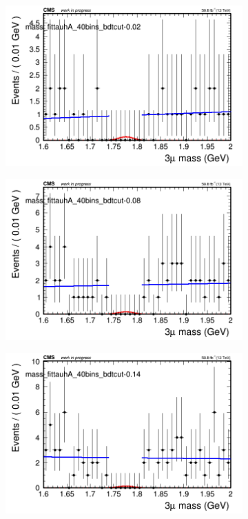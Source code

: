 \begin{figure}[H]
    \centering
    \begin{subfigure}{0.2\textwidth}
        \includegraphics[width=\textwidth]{power_law/plots/tauhA/massfit_tauhA_40bins_bdtcut-0.02.png}
        \caption{}
    \end{subfigure}
    \begin{subfigure}{0.2\textwidth}
        \includegraphics[width=\textwidth]{power_law/plots/tauhA/massfit_tauhA_40bins_bdtcut-0.08.png}
        \caption{}
    \end{subfigure}
    \begin{subfigure}{0.2\textwidth}
        \includegraphics[width=\textwidth]{power_law/plots/tauhA/massfit_tauhA_40bins_bdtcut-0.14.png}

\end{subfigure}
\end{figure}
